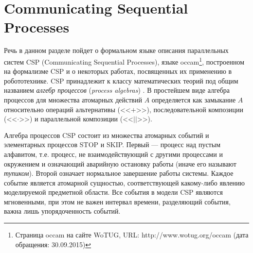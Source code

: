 \documentclass[conference]{IEEEtran}
\begin{document}
\section{Communicating Sequential Processes}
Речь в данном разделе пойдет о формальном языке описания параллельных систем CSP 
(Communicating Sequential Processes), языке 
occam\footnote{Страница occam на сайте WoTUG, URL: http://www.wotug.org/occam (дата обращения: 30.09.2015)}, 
построенном на формализме CSP и о некоторых работах, посвященных их применению 
в робототехнике. CSP принадлежит к классу математических теорий под общим 
названием \textit{алгебр процессов} (\textit{process algebras})
\cite{baeten2005brief, fokkink2013introduction}. В простейшем виде алгебра 
процессов для множества атомарных действий $A$ определяется как замыкание 
$A$ относительно операций альтернативы (<<$+$>>), последовательной 
композиции (<<$\cdot$>>) и параллельной композиции (<<$||$>>).

Алгебра процессов CSP состоит из множества атомарных событий и элементарных 
процессов STOP и SKIP. Первый --- процесс над пустым алфавитом, т.е. процесс, 
не взаимодействующий с другими процессами и окружением и означающий аварийную 
остановку работы (иначе его называют \textit{тупиком}). Второй означает 
нормальное завершение работы системы. Каждое событие является атомарной сущностью, 
соответствующей какому-либо явлению моделируемой предметной области. Все события 
в модели CSP являются мгновенными, при этом не важен интервал времени, 
разделяющий события, важна лишь упорядоченность событий.
\end{document}
